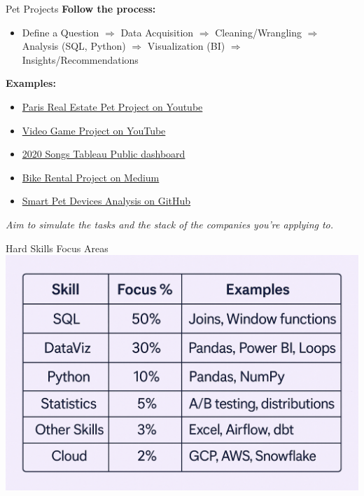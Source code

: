 \documentclass[10pt,a4paper]{article}
\begin{document}
\begin{multicols}{3}
\begin{textbox}{Pet Projects}
\textbf{Follow the process:}
\begin{itemize}
    \item Define a Question $\Rightarrow$ Data Acquisition $\Rightarrow$ Cleaning/Wrangling $\Rightarrow$ Analysis (SQL, Python) $\Rightarrow$ Visualization (BI) $\Rightarrow$ Insights/Recommendations
\end{itemize}
\textbf{Examples:}
\begin{itemize}
    \item \href{https://youtube.com/watch?v=HKuhMtrEgDE}{Paris Real Estate Pet Project on Youtube}
    \item \href{https://youtube.com/watch?v=HKuhMtrEgDE}{Video Game Project on YouTube} 
    \item \href{https://public.tableau.com/app/profile/ryansoares/viz/GoogleSearchTrendsMostSuccessfulSongsof2020/Dashboard}{2020 Songs Tableau Public dashboard} 
    \item \href{https://medium.com/@joseikwame/cyclistic-bike-share-analysis-case-study-99095c444505}{Bike Rental Project on Medium} 
    \item \href{https://github.com/amritachinnam/Customer-Data-Analytics-Power-BI}{Smart Pet Devices Analysis on GitHub}
\end{itemize}

\textit{Aim to simulate the tasks and the stack of the companies you’re applying to.}

\end{textbox}

\begin{textbox}{Hard Skills Focus Areas}
	\includegraphics[width=\textwidth]{table.png}
\end{textbox}


\end{multicols}
\end{document}

